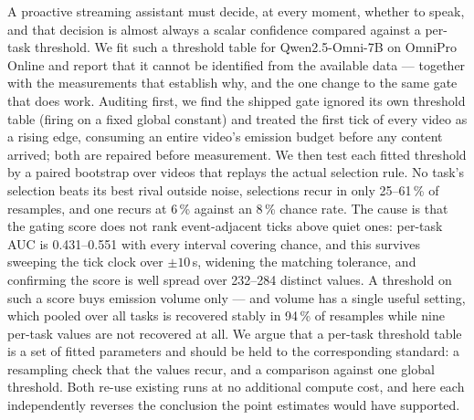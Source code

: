 A proactive streaming assistant must decide, at every moment, whether to speak,
and that decision is almost always a scalar confidence compared against a
per-task threshold. We fit such a threshold table for Qwen2.5-Omni-7B on OmniPro Online and
report that it cannot be identified from the available data --- together with the
measurements that establish why, and the one change to the same gate that does
work. Auditing first, we find the shipped gate ignored its own threshold table
(firing on a fixed global constant) and treated the first tick of every video as a
rising edge, consuming an entire video's emission budget before any content
arrived; both are repaired before measurement. We then test each fitted threshold
by a paired bootstrap over videos that replays the actual selection rule. No task's
selection beats its best rival outside noise, selections recur in only 25--61\,\% of
resamples, and one recurs at 6\,\% against an 8\,\% chance rate. The cause is that
the gating score does not rank event-adjacent ticks above quiet ones: per-task AUC
is 0.431--0.551 with every interval covering chance, and this survives sweeping the
tick clock over $\pm 10$\,s, widening the matching tolerance, and confirming the
score is well spread over 232--284 distinct values. A threshold on such a score buys
emission volume only --- and volume has a single useful setting, which pooled over
all tasks is recovered stably in 94\,\% of resamples while nine per-task values are
not recovered at all. We argue that a per-task threshold table is a set of fitted
parameters and should be held to the corresponding standard: a resampling check
that the values recur, and a comparison against one global threshold. Both re-use
existing runs at no additional compute cost, and here each independently reverses
the conclusion the point estimates would have supported.

